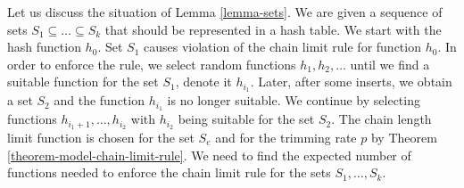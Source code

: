 Let us discuss the situation of Lemma \ref{lemma-sets}. We are given a sequence of sets $S_1 \subseteq \dots \subseteq S_k$ that should be represented in a hash table. We start with the hash function $h_0$. Set $S_1$ causes violation of the chain limit rule for function $h_0$. In order to enforce the rule, we select random functions $h_1, h_2, \dots$ until we find a suitable function for the set $S_1$, denote it $h_{i_1}$. Later, after some inserts, we obtain a set $S_2$ and the function $h_{i_1}$ is no longer suitable. We continue by selecting functions $h_{i_1 + 1}, \dots, h_{i_2}$ with $h_{i_2}$ being suitable for the set $S_2$. The chain length limit function is chosen for the set $S_e$ and for the trimming rate $p$ by Theorem \ref{theorem-model-chain-limit-rule}. We need to find the expected number of functions needed to enforce the chain limit rule for the sets $S_1, \dots, S_k$.

